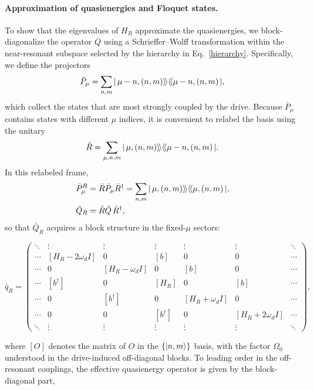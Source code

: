 \begin{appendices}
\paragraph{Approximation of quasienergies and Floquet states.}
To show that the eigenvalues of $H_R$ approximate the quasienergies, we block-diagonalize the operator $\overline{Q}$ using a Schrieffer--Wolff transformation within the near-resonant subspace selected by the hierarchy in Eq.~\eqref{hierarchy}. Specifically, we define the projectors
\begin{equation}
    \bar P_\mu=\sum_{n,m}|\,\mu-n,(n,m)\rangle\!\rangle\langle\!\langle\mu-n,(n,m)\,|,
\end{equation}
which collect the states that are most strongly coupled by the drive. Because $\bar P_\mu$ contains states with different $\mu$ indices, it is convenient to relabel the basis using the unitary
\begin{equation}
    \bar R=\sum_{\mu,n,m}|\,\mu,(n,m)\rangle\!\rangle\langle\!\langle\mu-n,(n,m)\,|.
\end{equation}
In this relabeled frame,
\begin{align}
    \bar P_\mu^{R} &= \bar R \bar P_\mu \bar R^\dagger
    =\sum_{n,m}|\,\mu,(n,m)\rangle\!\rangle\langle\!\langle\mu,(n,m)\,|,\\
    \bar Q_{R} &= \bar R \bar Q\,\bar R^\dagger,
\end{align}
so that $\bar Q_R$ acquires a block structure in the fixed-$\mu$ sectors:
\begin{widetext}
\begin{equation}
    \bar q_R=
    \begin{pmatrix}
     \ddots & \vdots & \vdots & \vdots & \vdots & \vdots & \ddots \\
     \cdots & [H_R-2\omega_d I] & 0 & [b] & 0 & 0 & \cdots \\
     \cdots & 0 & [H_R-\omega_d I] & 0 & [b] & 0 & \cdots \\
     \cdots & [b^\dagger] & 0 & [H_R] & 0 & [b] & \cdots \\
     \cdots & 0 & [b^\dagger] & 0 & [H_R+\omega_d I] & 0 & \cdots \\
     \cdots & 0 & 0 & [b^\dagger] & 0 & [H_R+2\omega_d I] & \cdots \\
     \ddots & \vdots & \vdots & \vdots & \vdots & \vdots & \ddots
    \end{pmatrix},
\end{equation}
\end{widetext}
where $[O]$ denotes the matrix of $O$ in the $\{\ket{n,m}\}$ basis, with the factor $\Omega_0$ understood in the drive-induced off-diagonal blocks. To leading order in the off-resonant couplings, the effective quasienergy operator is given by the block-diagonal part,

\end{appendices}
